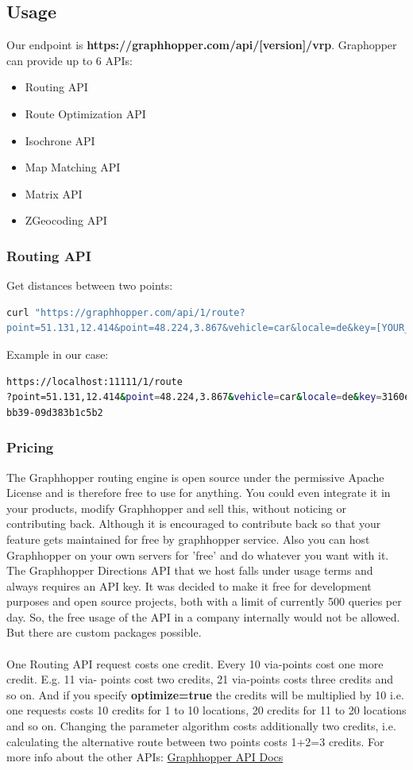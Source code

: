 \documentclass[12pt]{article}
\begin{document}
\subsection{Usage}
Our endpoint is \textbf{https://graphhopper.com/api/[version]/vrp}.
Graphopper can provide up to 6 APIs: 
\begin{itemize}
\item Routing API
\item Route Optimization API
\item Isochrone API
\item Map Matching API
\item Matrix API
\item ZGeocoding API
\end{itemize}
\subsubsection{Routing API}
Get distances between two points:
\begin{lstlisting}[language=bash,breaklines=true]
curl "https://graphhopper.com/api/1/route?
point=51.131,12.414&point=48.224,3.867&vehicle=car&locale=de&key=[YOUR_KEY]"
\end{lstlisting}
Example in our case:
\begin{lstlisting}[language=bash,breaklines=true]
https://localhost:11111/1/route
?point=51.131,12.414&point=48.224,3.867&vehicle=car&locale=de&key=3160e710-58ed-45da-
bb39-09d383b1c5b2
\end{lstlisting}
\subsubsection{Pricing}
The Graphhopper routing engine is open source under the permissive Apache License and is
therefore free to use for anything. You could even integrate it in your products, modify
Graphhopper and sell this, without noticing or contributing back. Although it is encouraged to
contribute back so that your feature gets maintained for free by graphhopper service. Also you
can host Graphhopper on your own servers for 'free' and do whatever you want with it.
The Graphhopper Directions API that we host falls under usage terms and always requires an
API key. It was decided to make it free for development purposes and open source projects,
both with a limit of currently 500 queries per day. So, the free usage of the API in a company
internally would not be allowed. But there are custom packages possible.\\\\
One Routing API request costs one credit. Every 10 via-points cost one more credit. E.g. 11 via-
points cost two credits, 21 via-points costs three credits and so on. And if you specify \textbf{optimize=true} the credits will be multiplied by 10 i.e. one requests costs 10 credits for 1 to 10 locations, 20 credits for 11 to 20 locations and so on. Changing the parameter algorithm costs additionally two credits, i.e. calculating the alternative route between two points costs 1+2=3 credits.
For more info about the other APIs:
\href{https://graphhopper.com/api/1/docs/FAQ/}{Graphhopper API Docs}
\end{document}
